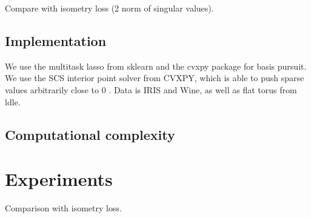 Compare with isometry loss (2 norm of singular values).

\subsection{Implementation}

We use the multitask lasso from sklearn and the cvxpy package for basis pursuit.  We use the SCS interior point solver from CVXPY, which is able to push sparse values arbitrarily close to 0 \cite{cvxpy_sparse_solution}. Data is IRIS and Wine, as well as flat torus from ldle.
\subsection{Computational complexity}
\section{Experiments}

Comparison with isometry loss.